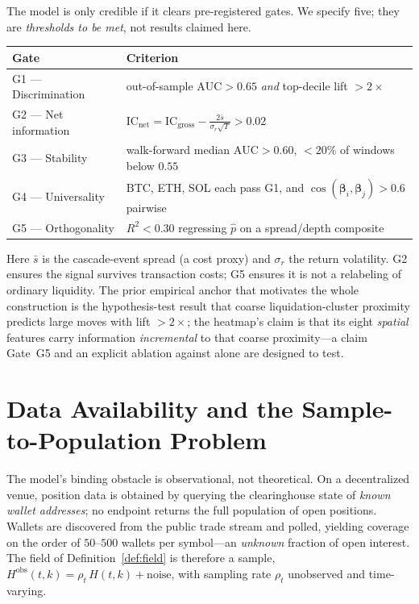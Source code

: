 \documentclass[11pt,a4paper]{article}
\theoremstyle{definition}
\theoremstyle{plain}
\newcommand{\code}[1]{\texttt{\detokenize{#1}}}
\begin{document}
The model is only credible if it clears pre-registered gates. We specify five; they are
\emph{thresholds to be met}, not results claimed here.

\begin{center}\small
\begin{tabular}{l l}
\hline
\textbf{Gate} & \textbf{Criterion} \\
\hline
G1 — Discrimination & out-of-sample $\mathrm{AUC} > 0.65$ \emph{and} top-decile lift $> 2\times$ \\
G2 — Net information & $\mathrm{IC}_{\text{net}} = \mathrm{IC}_{\text{gross}} - \tfrac{2\bar s}{\sigma_r\sqrt T} > 0.02$ \\
G3 — Stability & walk-forward median $\mathrm{AUC} > 0.60$, $<20\%$ of windows below $0.55$ \\
G4 — Universality & BTC, ETH, SOL each pass G1, and $\cos(\boldsymbol\beta_i,\boldsymbol\beta_j) > 0.6$ pairwise \\
G5 — Orthogonality & $R^2 < 0.30$ regressing $\hat p$ on a spread/depth composite \\
\hline
\end{tabular}
\end{center}

\noindent Here $\bar s$ is the cascade-event spread (a cost proxy) and $\sigma_r$ the return
volatility. G2 ensures the signal survives transaction costs; G5 ensures it is not a relabeling of
ordinary liquidity. The prior empirical anchor that motivates the whole construction is the
hypothesis-test result that coarse liquidation-cluster proximity predicts large moves with lift
$> 2\times$; the heatmap's claim is that its eight \emph{spatial} features carry information
\emph{incremental} to that coarse proximity---a claim Gate~G5 and an explicit ablation against
\code{hm_nearest_cluster_dist} alone are designed to test.

\section{Data Availability and the Sample-to-Population Problem}
\label{sec:data}

The model's binding obstacle is observational, not theoretical. On a decentralized venue, position
data is obtained by querying the clearinghouse state of \emph{known wallet addresses}; no endpoint
returns the full population of open positions. Wallets are discovered from the public trade stream
and polled, yielding coverage on the order of $50$--$500$ wallets per symbol---an \emph{unknown}
fraction of open interest. The field of Definition~\ref{def:field} is therefore a sample,
$H^{\text{obs}}(t,k) = \rho_t\, H(t,k) + \text{noise}$, with sampling rate $\rho_t$ unobserved and
time-varying.
\end{document}
